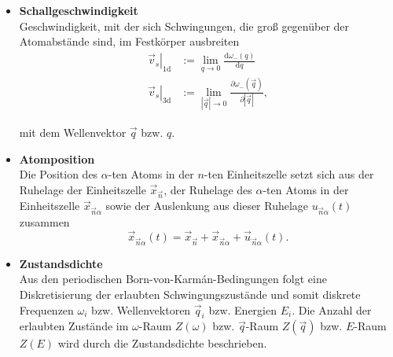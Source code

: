 \documentclass{article}
\newcommand{\diff}{\mathrm{d}}
\begin{document}
	
	\begin{itemize}
		\item \textbf{Schallgeschwindigkeit}\\
			Geschwindigkeit, mit der sich Schwingungen, die groß gegenüber der Atomabstände sind, im Festkörper ausbreiten
				\begin{align}
					\left.\vec{v}_s \right|_{1\text{d}} &:= \lim_{q \to 0} \frac{\diff \omega_-(q)}{\diff q} \\
					\left.\vec{v}_s \right|_{3\text{d}} &:= \lim_{|\vec{q}| \to 0} \frac{\partial\omega_-(\vec{q})}{\partial |\vec{q}|},
				\end{align}
		
		mit dem Wellenvektor $\vec{q}$ bzw. $q$.
		
		
		\item \textbf{Atomposition}\\
		Die Position des $\alpha$-ten Atoms in der $n$-ten Einheitszelle setzt sich aus der Ruhelage der Einheitszelle $\vec{x}_{\vec{n}}$, der Ruhelage des $\alpha$-ten Atoms in der Einheitszelle $\vec{x}_{\vec{n}\alpha}$ sowie der Auslenkung aus dieser Ruhelage $u_{\vec{n}\alpha}(t)$ zusammen
			\begin{equation}
				\vec{x}_{\vec{n}\alpha}(t) = \vec{x}_{\vec{n}} + \vec{x}_{\vec{n}\alpha} + \vec{u}_{\vec{n}\alpha}(t).
			\end{equation}
		
		
		\item \textbf{Zustandsdichte}\\
		Aus den periodischen Born-von-Karmán-Bedingungen folgt eine Diskretisierung der erlaubten Schwingungszustände und somit diskrete Frequenzen $\omega_i$ bzw. Wellenvektoren $\vec{q}_i$ bzw. Energien $E_i$. Die Anzahl der erlaubten Zustände im $\omega$-Raum $Z(\omega)$ bzw. $\vec{q}$-Raum $Z(\vec{q})$ bzw. $E$-Raum $Z(E)$ wird durch die Zustandsdichte beschrieben.
	\end{itemize}


\newpage
\end{document}
